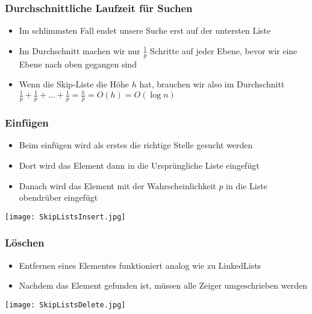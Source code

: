 		\subsubsection{Durchschnittliche Laufzeit für Suchen}
			\begin{itemize}
				\item Im schlimmsten Fall endet unsere Suche erst auf der untersten Liste
				\item Im Durchschnitt machen wir nur $\frac{1}{p}$ Schritte auf jeder Ebene, 
					bevor wir eine Ebene nach oben gegangen sind
				\item Wenn die Skip-Liste die Höhe $h$ hat, brauchen wir also im Durchschnitt \\
					$\frac{1}{p} + \frac{1}{p} + \dots + \frac{1}{p} = \frac{h}{p} = O(h) = O(\log n)$
			\end{itemize}


		\subsubsection{Einfügen}
			\begin{minipage}{0.5\textwidth}
				\begin{itemize}
					\item Beim einfügen wird als erstes die richtige Stelle gesucht werden
					\item Dort wird das Element dann in die Ursprüngliche Liste eingefügt
					\item Danach wird das Element mit der Wahrscheinlichkeit $p$ in die Liste
						obendrüber eingefügt
				\end{itemize}
			\end{minipage}
			\hspace{1cm}
			\begin{minipage}{0.45\textwidth}
				\begin{center}
					\texttt{[image: SkipListsInsert.jpg]}
				\end{center}
			\end{minipage}


		\subsubsection{Löschen}
			\begin{minipage}{0.5\textwidth}
				\begin{itemize}
					\item Entfernen eines Elementes funktioniert analog wie zu LinkedLists
					\item Nachdem das Element gefunden ist, müssen alle Zeiger umgeschrieben werden
				\end{itemize}			
			\end{minipage}
			\hspace{1cm}
			\begin{minipage}{0.45\textwidth}
				\begin{center}
					\texttt{[image: SkipListsDelete.jpg]}
				\end{center}
			\end{minipage}


